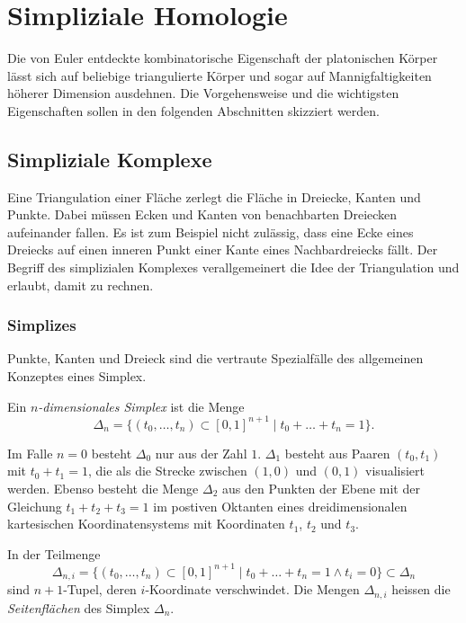 %
%
\section{Simpliziale Homologie
\label{buch:topologie:section:simplex}}
%
Die von Euler entdeckte kombinatorische Eigenschaft der platonischen
Körper lässt sich auf beliebige triangulierte Körper und sogar
auf Mannigfaltigkeiten höherer Dimension ausdehnen.
Die Vorgehensweise und die wichtigsten Eigenschaften sollen in den
folgenden Abschnitten skizziert werden.

%
%
\subsection{Simpliziale Komplexe}
Eine Triangulation einer Fläche zerlegt die Fläche in Dreiecke,
Kanten und Punkte.
Dabei müssen Ecken und Kanten von benachbarten Dreiecken aufeinander
fallen.
Es ist zum Beispiel nicht zulässig, dass eine Ecke eines Dreiecks
auf einen inneren Punkt einer Kante eines Nachbardreiecks fällt.
Der Begriff des simplizialen Komplexes verallgemeinert die Idee
der Triangulation und erlaubt, damit zu rechnen.

%
%
\subsubsection{Simplizes}
Punkte, Kanten und Dreieck sind die vertraute Spezialfälle des allgemeinen
Konzeptes eines Simplex.

\begin{definition}[Simplex]
%
Ein \emph{$n$-dimensionales Simplex} ist die Menge
\[
\Delta_n
=
\{
(t_0,\dots,t_n)
\subset
[0,1]^{n+1}
\mid
t_0+\dots+t_n=1
\}.
\]
\end{definition}

Im Falle $n=0$ besteht $\Delta_0$ nur aus der Zahl $1$.
$\Delta_1$ besteht aus Paaren $(t_0,t_1)$ mit $t_0+t_1=1$, die
als die Strecke zwischen $(1,0)$ und $(0,1)$ visualisiert
werden.
Ebenso besteht die Menge $\Delta_2$ aus den Punkten der Ebene mit
der Gleichung $t_1+t_2+t_3=1$ im postiven Oktanten eines
dreidimensionalen kartesischen Koordinatensystems mit Koordinaten
$t_1$, $t_2$ und $t_3$.

In der Teilmenge
\[
\Delta_{n,i}
=
\{
(t_0,\dots,t_n)
\subset
[0,1]^{n+1}
\mid
t_0+\dots+t_n=1
\wedge
t_i=0
\}
\subset
\Delta_n
\]
sind $n+1$-Tupel, deren $i$-Koordinate verschwindet.
Die Mengen $\Delta_{n,i}$ heissen die \emph{Seitenflächen}
%
des Simplex $\Delta_n$.

